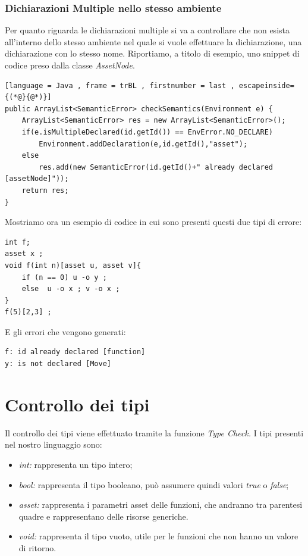 \documentclass[12pt, a4paper]{report}
\begin{document}
\subsection{Dichiarazioni Multiple nello stesso ambiente}
Per quanto riguarda le dichiarazioni multiple si va a controllare che non esista all'interno dello stesso ambiente nel quale si vuole effettuare la dichiarazione, una dichiarazione con lo stesso nome. Riportiamo, a titolo di esempio, uno snippet di codice preso dalla classe \emph{AssetNode}.
\begin{lstlisting}[language = Java , frame = trBL , firstnumber = last , escapeinside={(*@}{@*)}]
public ArrayList<SemanticError> checkSemantics(Environment e) {
    ArrayList<SemanticError> res = new ArrayList<SemanticError>();
    if(e.isMultipleDeclared(id.getId()) == EnvError.NO_DECLARE)
        Environment.addDeclaration(e,id.getId(),"asset");
    else
        res.add(new SemanticError(id.getId()+" already declared [assetNode]"));
    return res;
}
\end{lstlisting}
Mostriamo ora un esempio di codice in cui sono presenti questi due tipi di errore:
\begin{lstlisting}
int f;
asset x ;
void f(int n)[asset u, asset v]{
    if (n == 0) u -o y ;
    else  u -o x ; v -o x ;
}
f(5)[2,3] ;
\end{lstlisting}
E gli errori che vengono generati:
\begin{lstlisting}
f: id already declared [function]
y: is not declared [Move]
\end{lstlisting}

\chapter{Controllo dei tipi}
Il controllo dei tipi viene effettuato tramite la funzione \emph{Type Check.} I tipi presenti nel nostro linguaggio sono:
\begin{itemize}
    \item \emph{int:} rappresenta un tipo intero;
    \item \emph{bool:} rappresenta il tipo booleano, può assumere quindi valori \emph{true} o \emph{false};
    \item \emph{asset:} rappresenta i parametri asset delle funzioni, che andranno tra parentesi quadre e rappresentano delle risorse generiche.
    \item \emph{void:} rappresenta il tipo vuoto, utile per le funzioni che non hanno un valore di ritorno. 
\end{itemize}
\end{document}
